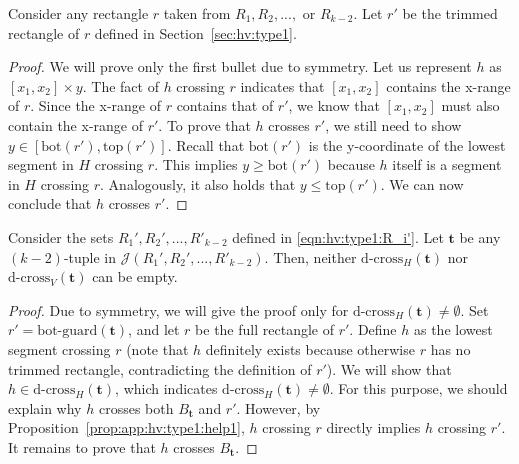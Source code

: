 \documentclass[acmsmall,review,anonymous]{acmart}
\def\J{\mathcal{J}}
\def\ybot{\mathrm{bot}}
\def\ytop{\mathrm{top}}
\def\gbot{\mathrm{bot\text{-}guard}}
\def\dcross{\mathrm{d\text{-}cross}}
\begin{document}
{{{\begin{proposition} \label{prop:app:hv:type1:help1}
    Consider any rectangle $r$ taken from $R_1, R_2, ...,$ or $R_{k-2}$. Let $r'$ be the trimmed rectangle of $r$ defined in Section~\ref{sec:hv:type1}. 
\end{proposition}

\begin{proof}
    We will prove only the first bullet due to symmetry. Let us represent $h$ as $[x_1, x_2] \times y$. The fact of $h$ crossing $r$ indicates that $[x_1, x_2]$ contains the x-range of $r$. Since the x-range of $r$ contains that of $r'$, we know that $[x_1, x_2]$ must also contain the x-range of $r'$. To prove that $h$ crosses $r'$, we still need to show $y \in [\ybot(r'), \ytop(r')]$. Recall that $\ybot(r')$ is the y-coordinate of the lowest segment in $H$ crossing $r$. This implies $y \ge \ybot(r')$ because $h$ itself is a segment in $H$ crossing $r$. Analogously, it also holds that $y \le \ytop(r')$. We can now conclude that $h$ crosses $r'$.
\end{proof}

\begin{proposition} \label{prop:app:hv:type1:help2}
    Consider the sets $R_1', R_2', ..., R'_{k-2}$ defined in \eqref{eqn:hv:type1:R_i'}. Let $\bm{t}$ be any $(k-2)$-tuple in $\J(R_1', R_2', ..., R'_{k-2})$. Then, neither $\dcross_H(\bm{t})$ nor $\dcross_V(\bm{t})$ can be empty. 
\end{proposition}

\begin{proof}
    Due to symmetry, we will give the proof only for $\dcross_H(\bm{t}) \ne \emptyset$. Set $r' = \gbot(\bm{t})$, and let $r$ be the full rectangle of $r'$. Define $h$ as the lowest segment crossing $r$ (note that $h$ definitely exists because otherwise $r$ has no trimmed rectangle, contradicting the definition of $r'$). We will show that $h \in \dcross_H(\bm{t})$, which indicates $\dcross_H(\bm{t}) \ne \emptyset$. For this purpose, we should explain why $h$ crosses both $B_{\bm{t}}$ and $r'$. However, by Proposition~\ref{prop:app:hv:type1:help1}, $h$ crossing $r$ directly implies $h$ crossing $r'$. It remains to prove that $h$ crosses $B_\bm{t}$.


\end{proof}}}}
\end{document}

